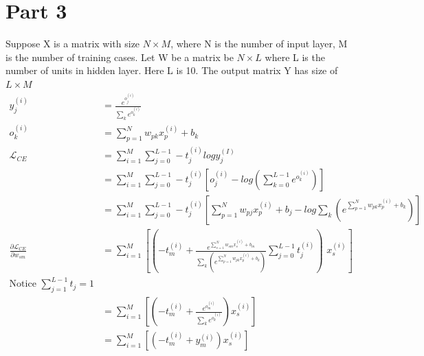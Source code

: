 \documentclass[12pt]{article}
\begin{document}
\section*{Part 3}
Suppose X is a matrix with size $N\times M$, where N is the number of input layer, M is the number of training cases. Let W be a matrix be $N\times L$ where L is the number of units in hidden layer. Here L is 10. The output matrix Y has size of $L\times M$
\begin{align}
    y_j^{(i)} &= \frac{e^{o_j^{(i)}}}{\sum_k e^{o_k^{(i)}}}\\
    o_k^{(i)} &= \sum_{p=1}^{N}w_{pk}x_p^{(i)}+b_k\\
    \mathcal{L}_{CE} 
    &= \sum_{i=1}^M \sum_{j=0}^{L-1} -t_j^{(i)}logy_j^{(I)}\\
    &= \sum_{i=1}^M \sum_{j=0}^{L-1} -t_j^{(i)}[o_j^{(i)}-log(\sum_{k=0}^{L-1} e^{o_k^{(i)}})]\\
    &= \sum_{i=1}^M \sum_{j=0}^{L-1} -t_j^{(i)}[\sum_{p=1}^{N}w_{pj}x_p^{(i)}+b_j - log\sum_k (e^{\sum_{p=1}^{N}w_{pk}x_p^{(i)}+b_k})]\\
    \frac{\partial \mathcal{L}_{CE}}{\partial w_{sm}}
    &= \sum_{i=1}^M [(-t_m^{(i)} + \frac{e^{\sum_{s=1}^{N}w_{sm}x_s^{(i)}+b_m}}{\sum_k (e^{\sum_{p=1}^{N}w_{pk}x_p^{(i)}+b_k})}\sum_{j=0}^{L-1} t_j^{(i)})\,\,x_s^{(i)}]\\ \text{Notice $\sum_{j=1}^{L-1} t_j = 1$}\\
    &= \sum_{i=1}^M [(-t_m^{(i)} + \frac{e^{o_m^{(i)}}}{\sum_k e^{o_k^{(i)}}})x_s^{(i)}]\\
    &= \sum_{i=1}^M [(-t_m^{(i)} + y_m^{(i)})x_s^{(i)}]
\end{align}
\end{document}

